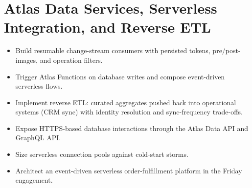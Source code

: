 \chapter{Atlas Data Services, Serverless Integration, and Reverse ETL}
%

\begin{objectives}
\begin{itemize}
    \item Build resumable change-stream consumers with persisted tokens, pre/post-images, and operation filters.
    \item Trigger Atlas Functions on database writes and compose event-driven serverless flows.
    \item Implement reverse ETL: curated aggregates pushed back into operational systems (CRM sync) with identity resolution and sync-frequency trade-offs.
    \item Expose HTTPS-based database interactions through the Atlas Data API and GraphQL API.
    \item Size serverless connection pools against cold-start storms.
    \item Architect an event-driven serverless order-fulfillment platform in the Friday engagement.
\end{itemize}
\end{objectives}

